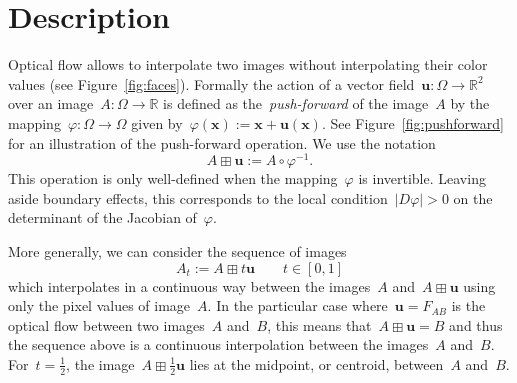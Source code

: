 \documentclass{ipol}
\def\R{\mathbb{R}}
\def\x{\mathbf{x}}
\def\u{\mathbf{u}}
\begin{document}
%
%
%
%
%


\section{Description}
Optical flow allows to interpolate two images without interpolating their
color values (see Figure~\ref{fig:faces}).  Formally the action of a vector
field~$\u:\Omega\to\R^2$ over an image~$A:\Omega\to\R$ is defined as
the~\emph{push-forward} of the image~$A$ by the
mapping~$\varphi:\Omega\to\Omega$ given by~$\varphi(\x):=\x+\u(\x)$.  See
Figure~\ref{fig:pushforward} for an illustration of the push-forward
operation.  We use the notation
\[
A\boxplus\u := A\circ\varphi^{-1}.
\]
This operation is only well-defined when the mapping~$\varphi$ is invertible.
Leaving aside boundary effects, this corresponds to the local
condition~$|D\varphi|>0$ on the determinant of the 
Jacobian of~$\varphi$. %
\par
More generally, we can consider the sequence of images
\[
A_t := A\boxplus t\u\qquad t\in[0,1]
\]
which interpolates in a continuous way between the images~$A$
and~$A\boxplus\u$ using only the pixel values of image~$A$.  In the particular
case where~$\u=F_{AB}$ is the optical flow between two images~$A$ and~$B$, this means
that~$A\boxplus\u=B$ and thus the sequence above is a continuous interpolation
between the images~$A$ and~$B$.  For~$t=\frac{1}{2}$, the
image~$A\boxplus\frac{1}{2}\u$ lies at the midpoint, or centroid, between~$A$
and~$B$.
\end{document}
